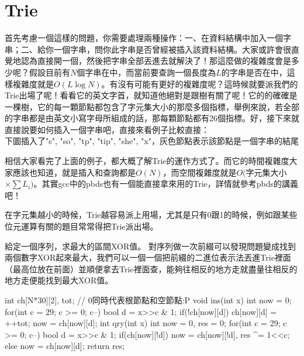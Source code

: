 \section{Trie}
首先考慮一個這樣的問題，你需要處理兩種操作：一、在資料結構中加入一個字串；二、給你一個字串，問你此字串是否曾經被插入該資料結構。大家或許會很直覺地認為直接開一個，然後把字串全部丟進去就解決了！那這麼做的複雜度會是多少呢？假設目前有$N$個字串在中，而當前要查詢一個長度為$L$的字串是否在中，這樣複雜度就是$O(L\log N)$。有沒有可能有更好的複雜度呢？這時候就要派我們的Trie出場了呢！看看它的英文字首，就知道他絕對是跟樹有關了呢！它的的確確是一棵樹，它的每一顆節點都包含了字元集大小的那麼多個指標，舉例來說，若全部的字串都是由英文小寫字母所組成的話，那每顆節點都有26個指標。好，接下來就直接說要如何插入一個字串吧，直接來看例子比較直接：\\
下圖插入了"s", "so", "tp", "tip", "she", "x"，灰色節點表示該節點是一個字串的結尾
\begin{center}

\iftrue
{}
\fi
\end{center}
相信大家看完了上面的例子，都大概了解Trie的運作方式了。而它的時間複雜度大家應該也知道，就是插入和查詢都是$O(N)$，而空間複雜度就是$O($字元集大小$\times \sum L_i)$。其實gcc中的pbds也有一個能直接拿來用的Trie，詳情就參考pbds的講義吧！

在字元集越小的時候，Trie越容易派上用場，尤其是只有0跟1的時候，例如跟某些位元運算有關的題目常常得把Trie派出場。

 {
給定一個序列，求最大的區間XOR值。
}
對序列做一次前綴可以發現問題變成找到兩個數字XOR起來最大，我們可以一個一個把前綴的二進位表示法丟進Trie裡面（最高位放在前面）並順便拿去Trie裡面查，能夠往相反的地方走就盡量往相反的地方走便能找到最大XOR值。

\begin{C++}
int ch[N*30][2], tot; // 0同時代表根節點和空節點:P
void ins(int x) {
	int now = 0;
	for(int c = 29; c >= 0; c--) {
		bool d = x>>c & 1;
		if(!ch[now][d])
			ch[now][d] = ++tot;
		now = ch[now][d];
	}
}
int qry(int x) {
	int now = 0, res = 0;
	for(int c = 29; c >= 0; c--) {
		bool d = x>>c & 1;
		if(ch[now][!d])
			now = ch[now][!d], res ^= 1<<c;
		else
			now = ch[now][d];	
	}
	return res;
}
\end{C++}

